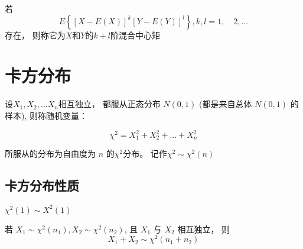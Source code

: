 \begin{definition}[$X$和$Y$的$k+l$阶混合中心矩]
    若
    \begin{equation} E\left\{[X-E(X)]^ k[Y-E(Y)]^l \right\},  k,l=1, \quad 2, \ldots \end{equation}
    存在， 则称它为$X$和$Y$的$k+l$阶混合中心矩
\end{definition}



\section{卡方分布}

\begin{definition}[卡方分布]
    设$X_1,X_2,...X_n$相互独立， 都服从正态分布 $N(0,1)$ (都是来自总体 $N(0,1)$ 的样本), 则称随机变量：

    \begin{equation}
        \chi^2 = X_1^2 + X_2^2 + ... + X_n^2
    \end{equation}

    所服从的分布为自由度为 $n$ 的$\chi^2$分布。 记作$\chi^2 \sim \chi^2(n)$
\end{definition}

\subsection{卡方分布性质}

\begin{corollary}
    $\chi^2(1) \sim X^2(1)$
\end{corollary}

\begin{corollary}
    若 $ X_{1} \sim \chi^{2}\left(n_{1}\right), X_{2} \sim \chi^{2}\left(n_{2}\right) $, 且 $ X_{1} $ 与 $ X_{2} $ 相互独立， 则
    \begin{equation}
        X_{1}+X_{2} \sim \chi^{2}\left(n_{1}+n_{2}\right)
    \end{equation}
\end{corollary}

